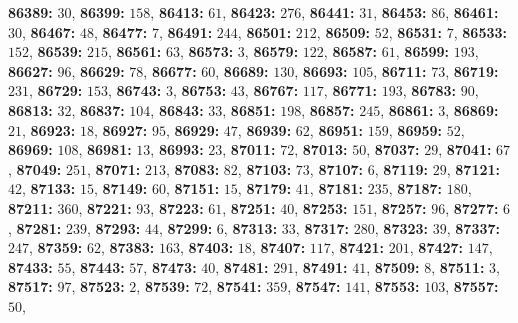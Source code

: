 \textsf{\bfseries 86389:} $30$, \textsf{\bfseries 86399:} $158$, \textsf{\bfseries 86413:} $61$, \textsf{\bfseries 86423:} $276$, \textsf{\bfseries 86441:} $31$, \textsf{\bfseries 86453:} $86$, \textsf{\bfseries 86461:} $30$, \textsf{\bfseries 86467:} $48$, \textsf{\bfseries 86477:} $7$, \textsf{\bfseries 86491:} $244$, \textsf{\bfseries 86501:} $212$, \textsf{\bfseries 86509:} $52$, \textsf{\bfseries 86531:} $7$, \textsf{\bfseries 86533:} $152$, \textsf{\bfseries 86539:} $215$, \textsf{\bfseries 86561:} $63$, \textsf{\bfseries 86573:} $3$, \textsf{\bfseries 86579:} $122$, \textsf{\bfseries 86587:} $61$, \textsf{\bfseries 86599:} $193$, \textsf{\bfseries 86627:} $96$, \textsf{\bfseries 86629:} $78$, \textsf{\bfseries 86677:} $60$, \textsf{\bfseries 86689:} $130$, \textsf{\bfseries 86693:} $105$, \textsf{\bfseries 86711:} $73$, \textsf{\bfseries 86719:} $231$, \textsf{\bfseries 86729:} $153$, \textsf{\bfseries 86743:} $3$, \textsf{\bfseries 86753:} $43$, \textsf{\bfseries 86767:} $117$, \textsf{\bfseries 86771:} $193$, \textsf{\bfseries 86783:} $90$, \textsf{\bfseries 86813:} $32$, \textsf{\bfseries 86837:} $104$, \textsf{\bfseries 86843:} $33$, \textsf{\bfseries 86851:} $198$, \textsf{\bfseries 86857:} $245$, \textsf{\bfseries 86861:} $3$, \textsf{\bfseries 86869:} $21$, \textsf{\bfseries 86923:} $18$, \textsf{\bfseries 86927:} $95$, \textsf{\bfseries 86929:} $47$, \textsf{\bfseries 86939:} $62$, \textsf{\bfseries 86951:} $159$, \textsf{\bfseries 86959:} $52$, \textsf{\bfseries 86969:} $108$, \textsf{\bfseries 86981:} $13$, \textsf{\bfseries 86993:} $23$, \textsf{\bfseries 87011:} $72$, \textsf{\bfseries 87013:} $50$, \textsf{\bfseries 87037:} $29$, \textsf{\bfseries 87041:} $67$, \textsf{\bfseries 87049:} $251$, \textsf{\bfseries 87071:} $213$, \textsf{\bfseries 87083:} $82$, \textsf{\bfseries 87103:} $73$, \textsf{\bfseries 87107:} $6$, \textsf{\bfseries 87119:} $29$, \textsf{\bfseries 87121:} $42$, \textsf{\bfseries 87133:} $15$, \textsf{\bfseries 87149:} $60$, \textsf{\bfseries 87151:} $15$, \textsf{\bfseries 87179:} $41$, \textsf{\bfseries 87181:} $235$, \textsf{\bfseries 87187:} $180$, \textsf{\bfseries 87211:} $360$, \textsf{\bfseries 87221:} $93$, \textsf{\bfseries 87223:} $61$, \textsf{\bfseries 87251:} $40$, \textsf{\bfseries 87253:} $151$, \textsf{\bfseries 87257:} $96$, \textsf{\bfseries 87277:} $6$, \textsf{\bfseries 87281:} $239$, \textsf{\bfseries 87293:} $44$, \textsf{\bfseries 87299:} $6$, \textsf{\bfseries 87313:} $33$, \textsf{\bfseries 87317:} $280$, \textsf{\bfseries 87323:} $39$, \textsf{\bfseries 87337:} $247$, \textsf{\bfseries 87359:} $62$, \textsf{\bfseries 87383:} $163$, \textsf{\bfseries 87403:} $18$, \textsf{\bfseries 87407:} $117$, \textsf{\bfseries 87421:} $201$, \textsf{\bfseries 87427:} $147$, \textsf{\bfseries 87433:} $55$, \textsf{\bfseries 87443:} $57$, \textsf{\bfseries 87473:} $40$, \textsf{\bfseries 87481:} $291$, \textsf{\bfseries 87491:} $41$, \textsf{\bfseries 87509:} $8$, \textsf{\bfseries 87511:} $3$, \textsf{\bfseries 87517:} $97$, \textsf{\bfseries 87523:} $2$, \textsf{\bfseries 87539:} $72$, \textsf{\bfseries 87541:} $359$, \textsf{\bfseries 87547:} $141$, \textsf{\bfseries 87553:} $103$, \textsf{\bfseries 87557:} $50$, 
